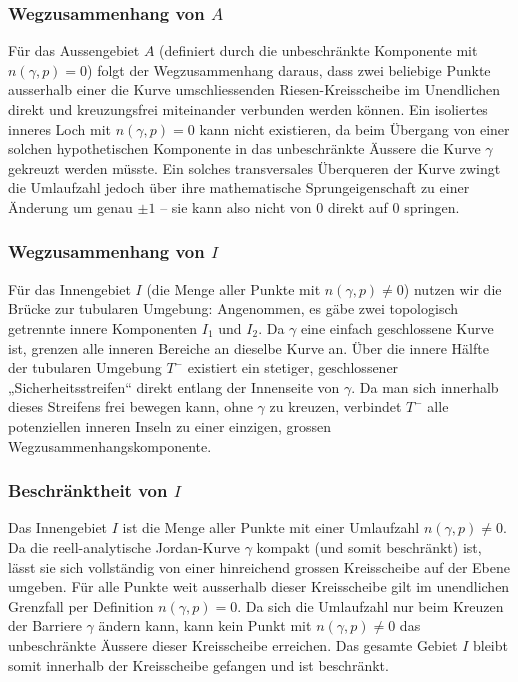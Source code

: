 \subsubsection{Wegzusammenhang von $A$
\label{jordan:subsubsection:wegzusammenhang_aussen_reell_analytisch_umlaufzahl}}

Für das Aussengebiet $A$ (definiert durch die unbeschränkte Komponente mit $n(\gamma, p) = 0$) folgt der Wegzusammenhang daraus, dass zwei beliebige Punkte ausserhalb einer die Kurve umschliessenden Riesen-Kreisscheibe im Unendlichen direkt und kreuzungsfrei miteinander verbunden werden können.
Ein isoliertes inneres Loch mit $n(\gamma, p) = 0$ kann nicht existieren, da beim Übergang von einer solchen hypothetischen Komponente in das unbeschränkte Äussere die Kurve $\gamma$ gekreuzt werden müsste. 
Ein solches transversales Überqueren der Kurve zwingt die Umlaufzahl jedoch über ihre mathematische Sprungeigenschaft zu einer Änderung um genau $\pm 1$ -- sie kann also nicht von 0 direkt auf 0 springen.

\subsubsection{Wegzusammenhang von $I$
\label{jordan:subsubsection:wegzusammenhang_innen_reell_analytisch_umlaufzahl}}

Für das Innengebiet $I$ (die Menge aller Punkte mit $n(\gamma, p) \neq 0$) nutzen wir die Brücke zur tubularen Umgebung: 
Angenommen, es gäbe zwei topologisch getrennte innere Komponenten $I_1$ und $I_2$. 
Da $\gamma$ eine einfach geschlossene Kurve ist, grenzen alle inneren Bereiche an dieselbe Kurve an. 
Über die innere Hälfte der tubularen Umgebung $T^{-}$ existiert ein stetiger, geschlossener „Sicherheitsstreifen“ direkt entlang der Innenseite von $\gamma$. 
Da man sich innerhalb dieses Streifens frei bewegen kann, ohne $\gamma$ zu kreuzen, verbindet $T^{-}$ alle potenziellen inneren Inseln zu einer einzigen, grossen Wegzusammenhangskomponente.

\subsubsection{Beschränktheit von $I$
\label{jordan:subsubsection:beschraenktheit_innen_reell_analytisch_umlaufzahl}}

Das Innengebiet $I$ ist die Menge aller Punkte mit einer Umlaufzahl $n(\gamma, p) \neq 0$. 
Da die reell-analytische Jordan-Kurve $\gamma$ kompakt (und somit beschränkt) ist, lässt sie sich vollständig von einer hinreichend grossen Kreisscheibe auf der Ebene umgeben. 
Für alle Punkte weit ausserhalb dieser Kreisscheibe gilt im unendlichen Grenzfall per Definition $n(\gamma, p) = 0$. 
Da sich die Umlaufzahl nur beim Kreuzen der Barriere $\gamma$ ändern kann, kann kein Punkt mit $n(\gamma, p) \neq 0$ das unbeschränkte Äussere dieser Kreisscheibe erreichen. 
Das gesamte Gebiet $I$ bleibt somit innerhalb der Kreisscheibe gefangen und ist beschränkt.


